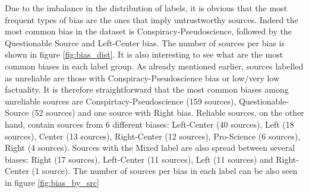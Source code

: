 Due to the imbalance in the distribution of labels, it is obvious that the most frequent types of bias are the ones that imply untrustworthy sources. Indeed the most common bias in the dataset is Conspiracy-Pseudoscience, followed by the Questionable Source and Left-Center bias. The number of sources per bias is shown in figure \ref{fig:bias_dist}.
It is also interesting to see what are the most common biases in each label group. As already mentioned earlier, sources labelled as unreliable are those with Conspiracy-Pseudoscience bias or low/very low factuality. It is therefore straightforward that the most common biases among unreliable sources are Conspirtacy-Pseudoscience (159 sources), Questionable-Source (52 sources) and one source with Right bias. 
Reliable sources, on the other hand, contain sources from 6 different biases: Left-Center (40 sources), Left (18 sources), Center (13 sources), Right-Center (12 sources), Pro-Science (6 sources), Right (4 sources). 
Sources with the Mixed label are also spread between several biases: Right (17 sources), Left-Center (11 sources), Left (11 sources) and Right-Center (1 source). The number of sources per bias in each label can be also seen in figure \ref{fig:bias_by_src}

